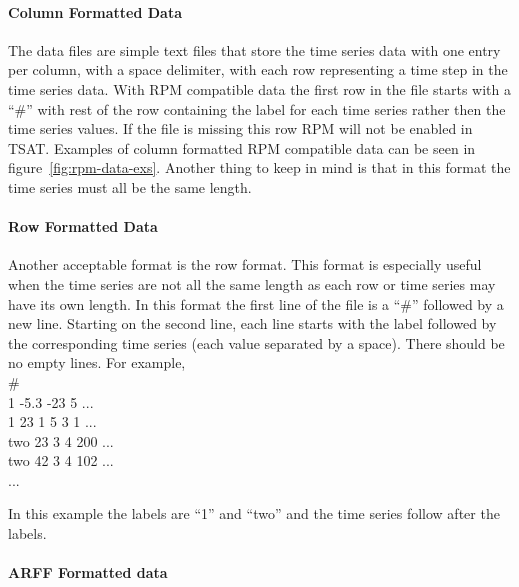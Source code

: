 \documentclass[letterpaper, 12pt]{article}
\newenvironment{allintypewriter}{\ttfamily}{\par}
\begin{document}
\paragraph{Column Formatted Data}
The data files are simple text files that store the time series data with one entry per column, with a space delimiter, with each row representing a time step in the time series data. With RPM compatible data the first row in the file starts with a ``\#'' with rest of the row containing the label for each time series rather then the time series values. If the file is missing this row RPM will not be enabled in TSAT. Examples of column formatted RPM compatible data can be seen in figure~\ref{fig:rpm-data-exs}.  Another thing to keep in mind is that in this format the time series must all be the same length. 

\paragraph{Row Formatted Data}
Another acceptable format is the row format.  This format is especially useful  when the time series are not all the same length as each row or time series may have its own length.  In this format the first line of the file is a ``\#'' followed by a new line.  Starting on the second line, each line starts with the label followed by the corresponding time series (each value separated by a space).  There should be no empty lines.  For example,\\
\begin{allintypewriter}
	\noindent\#\\
	1 -5.3 -23 5 ...\\
	1 23 1 5 3 1 ...\\
	two 23 3 4 200 ...\\
	two 42 3 4 102 ...\\
	...
\end{allintypewriter}
In this example the labels are ``1'' and ``two'' and the time series follow after the labels.

\paragraph{ARFF Formatted data}
\end{document}
